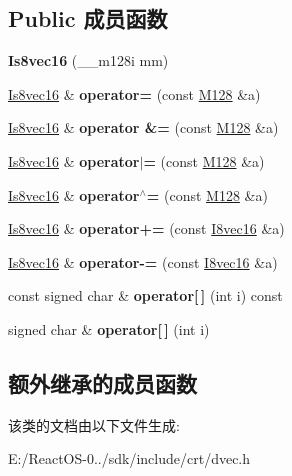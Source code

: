 \subsection*{Public 成员函数}
\begin{DoxyCompactItemize}
\item 
\mbox{\label{class_is8vec16_a6e7b0e08e63f8af80c5ba41480846a9c}} 
{\bfseries Is8vec16} (\+\_\+\+\_\+m128i mm)
\item 
\mbox{\label{class_is8vec16_ac7f3938c412854f18de7e0b1649fb4dd}} 
\hyperlink{class_is8vec16}{Is8vec16} \& {\bfseries operator=} (const \hyperlink{class_m128}{M128} \&a)
\item 
\mbox{\label{class_is8vec16_a98d4b8865ef1d3553fadc8349f89a34e}} 
\hyperlink{class_is8vec16}{Is8vec16} \& {\bfseries operator \&=} (const \hyperlink{class_m128}{M128} \&a)
\item 
\mbox{\label{class_is8vec16_a71b7aebc4e31ab4255d484ab10bfa0ba}} 
\hyperlink{class_is8vec16}{Is8vec16} \& {\bfseries operator$\vert$=} (const \hyperlink{class_m128}{M128} \&a)
\item 
\mbox{\label{class_is8vec16_a8238368976ccebb302c8cc232e5569e9}} 
\hyperlink{class_is8vec16}{Is8vec16} \& {\bfseries operator$^\wedge$=} (const \hyperlink{class_m128}{M128} \&a)
\item 
\mbox{\label{class_is8vec16_a9e16339305697beaa2a387a20d4a60ec}} 
\hyperlink{class_is8vec16}{Is8vec16} \& {\bfseries operator+=} (const \hyperlink{class_i8vec16}{I8vec16} \&a)
\item 
\mbox{\label{class_is8vec16_ae39698dbaea09756608e66a5edce86bb}} 
\hyperlink{class_is8vec16}{Is8vec16} \& {\bfseries operator-\/=} (const \hyperlink{class_i8vec16}{I8vec16} \&a)
\item 
\mbox{\label{class_is8vec16_aa8213c448e93f623d6577aa7aac8844a}} 
const signed char \& {\bfseries operator\mbox{[}$\,$\mbox{]}} (int i) const
\item 
\mbox{\label{class_is8vec16_ab5d9644fb492d2d5c278467fd77ee01b}} 
signed char \& {\bfseries operator\mbox{[}$\,$\mbox{]}} (int i)
\end{DoxyCompactItemize}
\subsection*{额外继承的成员函数}


该类的文档由以下文件生成\+:\begin{DoxyCompactItemize}
\item 
E\+:/\+React\+O\+S-\/0../sdk/include/crt/dvec.\+h\end{DoxyCompactItemize}
